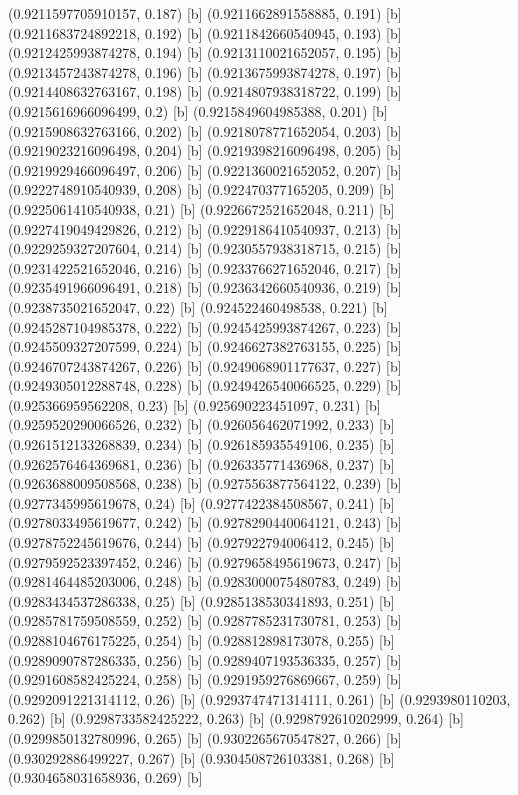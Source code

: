 {{{(0.9211597705910157, 0.187) [b] 
(0.9211662891558885, 0.191) [b] 
(0.9211683724892218, 0.192) [b] 
(0.9211842660540945, 0.193) [b] 
(0.9212425993874278, 0.194) [b] 
(0.9213110021652057, 0.195) [b] 
(0.9213457243874278, 0.196) [b] 
(0.9213675993874278, 0.197) [b] 
(0.9214408632763167, 0.198) [b] 
(0.9214807938318722, 0.199) [b] 
(0.9215616966096499, 0.2) [b] 
(0.9215849604985388, 0.201) [b] 
(0.9215908632763166, 0.202) [b] 
(0.9218078771652054, 0.203) [b] 
(0.9219023216096498, 0.204) [b] 
(0.9219398216096498, 0.205) [b] 
(0.9219929466096497, 0.206) [b] 
(0.9221360021652052, 0.207) [b] 
(0.9222748910540939, 0.208) [b] 
(0.922470377165205, 0.209) [b] 
(0.9225061410540938, 0.21) [b] 
(0.9226672521652048, 0.211) [b] 
(0.9227419049429826, 0.212) [b] 
(0.9229186410540937, 0.213) [b] 
(0.9229259327207604, 0.214) [b] 
(0.9230557938318715, 0.215) [b] 
(0.9231422521652046, 0.216) [b] 
(0.9233766271652046, 0.217) [b] 
(0.9235491966096491, 0.218) [b] 
(0.9236342660540936, 0.219) [b] 
(0.9238735021652047, 0.22) [b] 
(0.924522460498538, 0.221) [b] 
(0.9245287104985378, 0.222) [b] 
(0.9245425993874267, 0.223) [b] 
(0.9245509327207599, 0.224) [b] 
(0.9246627382763155, 0.225) [b] 
(0.9246707243874267, 0.226) [b] 
(0.9249068901177637, 0.227) [b] 
(0.9249305012288748, 0.228) [b] 
(0.9249426540066525, 0.229) [b] 
(0.925366959562208, 0.23) [b] 
(0.925690223451097, 0.231) [b] 
(0.9259520290066526, 0.232) [b] 
(0.926056462071992, 0.233) [b] 
(0.9261512133268839, 0.234) [b] 
(0.926185935549106, 0.235) [b] 
(0.9262576464369681, 0.236) [b] 
(0.926335771436968, 0.237) [b] 
(0.9263688009508568, 0.238) [b] 
(0.9275563877564122, 0.239) [b] 
(0.9277345995619678, 0.24) [b] 
(0.9277422384508567, 0.241) [b] 
(0.9278033495619677, 0.242) [b] 
(0.9278290440064121, 0.243) [b] 
(0.9278752245619676, 0.244) [b] 
(0.927922794006412, 0.245) [b] 
(0.9279592523397452, 0.246) [b] 
(0.9279658495619673, 0.247) [b] 
(0.9281464485203006, 0.248) [b] 
(0.9283000075480783, 0.249) [b] 
(0.9283434537286338, 0.25) [b] 
(0.9285138530341893, 0.251) [b] 
(0.9285781759508559, 0.252) [b] 
(0.9287785231730781, 0.253) [b] 
(0.9288104676175225, 0.254) [b] 
(0.928812898173078, 0.255) [b] 
(0.9289090787286335, 0.256) [b] 
(0.9289407193536335, 0.257) [b] 
(0.9291608582425224, 0.258) [b] 
(0.9291959276869667, 0.259) [b] 
(0.9292091221314112, 0.26) [b] 
(0.9293747471314111, 0.261) [b] 
(0.9293980110203, 0.262) [b] 
(0.9298733582425222, 0.263) [b] 
(0.9298792610202999, 0.264) [b] 
(0.9299850132780996, 0.265) [b] 
(0.9302265670547827, 0.266) [b] 
(0.930292886499227, 0.267) [b] 
(0.9304508726103381, 0.268) [b] 
(0.9304658031658936, 0.269) [b] 
}}}
